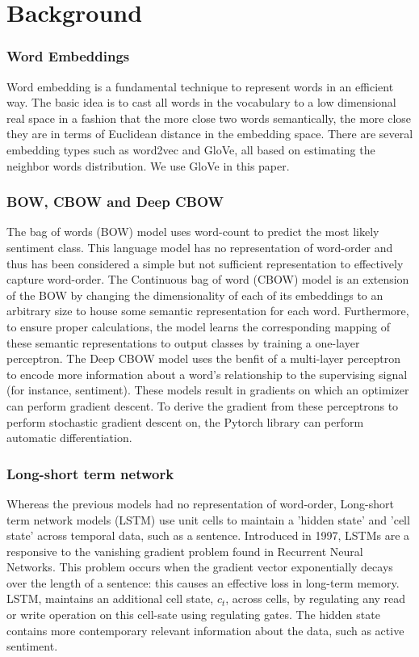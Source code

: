 \section{Background}
\label{sec: background}

\subsubsection{Word Embeddings}
Word embedding is a fundamental technique to represent words in an efficient
way. The basic idea is to cast all words in the vocabulary to a low dimensional
real space in a fashion that the more close two words semantically, the more
close they are in terms of Euclidean distance in the embedding space. There are
several embedding types such as word2vec\cite{mikolov2013distributed} and
GloVe\cite{pennington2014glove}, all based on estimating the neighbor words
distribution. We use GloVe in this paper.
 
\subsubsection{BOW, CBOW and Deep CBOW}
The bag of words (BOW) model uses word-count to predict the most likely
sentiment class. This language model has no representation of word-order and
thus has been considered a simple but not sufficient representation to
effectively capture word-order. The Continuous bag of word (CBOW)
model\cite{DBLP:journals/corr/abs-1301-3781} is an extension of the BOW by
changing the dimensionality of each of its embeddings to an arbitrary size to
house some semantic representation for each word. Furthermore, to ensure proper
calculations, the model learns the corresponding mapping of these semantic
representations to output classes by training a one-layer perceptron. The Deep
CBOW model uses the benfit of a multi-layer perceptron to encode more
information about a word's relationship to the supervising signal (for instance,
sentiment). These models result in gradients on which an optimizer can perform
gradient descent. To derive the gradient from these perceptrons to perform
stochastic gradient descent on, the Pytorch library can perform automatic
differentiation\cite{paszke2017automatic}.

\subsubsection{Long-short term network}
Whereas the  previous models had no representation of word-order, Long-short
term network models (LSTM) use unit cells to maintain a 'hidden state' and 'cell
state' across temporal data, such as a sentence. Introduced in
1997\cite{hochreiter1997long}, LSTMs are a responsive to the vanishing gradient
problem found in Recurrent Neural Networks\cite{bengio1994learning}. This
problem occurs when the gradient vector exponentially decays over the length of
a sentence: this causes an effective loss in long-term memory. LSTM, maintains
an additional cell state, $c_t$, across cells, by regulating any read or write
operation on this cell-sate using regulating gates. The hidden state contains
more contemporary relevant information about the data, such as active sentiment.

